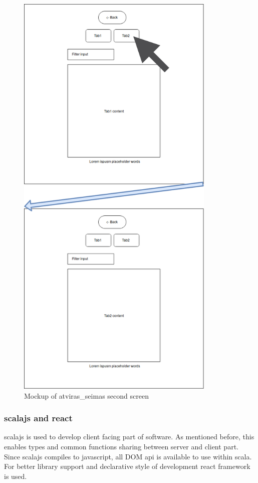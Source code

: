 \documentclass[a4paper,12pt]{article}
\begin{document}
	\begin{figure}[H]	
		\centering
		\includegraphics[width=9.5cm]{images/frontend_mockup_crop_2.png}
		\caption{Mockup of \gls{atviras_seimas} second screen}
		\label{fig:frontend_mockup_2}
	\end{figure}

	\subsubsection{\Gls{scalajs} and \gls{react}}
	\Gls{scalajs} is used to develop client facing part of software. As mentioned before, this enables types and common functions sharing between server and client part. Since \gls{scalajs} compiles to \gls{javascript}, all DOM \acrshort{api} is available to use within \Gls{scala}. For better library support and declarative style of development \gls{react} framework is used. 
	
\end{document}
